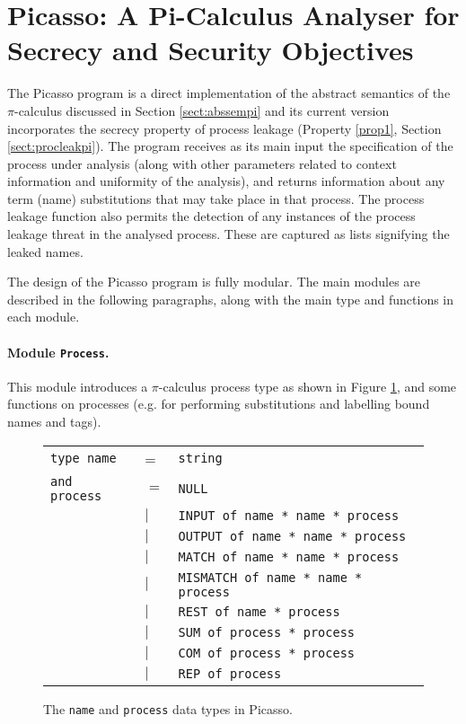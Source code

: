 \documentclass[10pt,a4paper,final,oneside,fleqn]{book}
\begin{document}
\section{Picasso: A Pi-Calculus Analyser for Secrecy and Security Objectives}
The Picasso program is a direct implementation of the abstract semantics of the $\pi$-calculus discussed in Section \ref{sect:abssempi} and its current version incorporates the secrecy property of process leakage (Property \ref{prop1}, Section \ref{sect:procleakpi}).  The program receives as its main input the specification of the process under analysis (along with other parameters related to context information and uniformity of the analysis), and returns information about any term (name) substitutions that may take place in that process.  The process leakage function also permits the detection of any instances of the process leakage threat in the analysed process.  These are captured as lists signifying the leaked names.

The design of the Picasso program is fully modular. The main modules are described in the following paragraphs, along with the main type and functions in each module.
\paragraph{Module \texttt{Process}.}  This module introduces a $\pi$-calculus process type as shown in Figure \ref{processtype}, and some functions on processes (e.g. for performing substitutions and labelling bound names and tags).
\begin{figure}[bht]
\begin{center}
\begin{tabular}{|lll|}
\hline
\texttt{type name}&=&\texttt{string}\\
\texttt{and process}&$=$&\texttt{NULL}\\
&$\mid$&\texttt{INPUT of name * name * process}\\
&$\mid$&\texttt{OUTPUT of name * name * process}\\
&$\mid$&\texttt{MATCH of name * name * process}\\
&$\mid$&\texttt{MISMATCH of name * name * process}\\
&$\mid$&\texttt{REST of name * process}\\
&$\mid$&\texttt{SUM of process * process}\\
&$\mid$&\texttt{COM of process * process}\\
&$\mid$&\texttt{REP of process}\\
\hline
\end{tabular}
\end{center}
\caption{The \texttt{name} and \texttt{process} data types in Picasso.\label{processtype}}
\end{figure}
\end{document}
